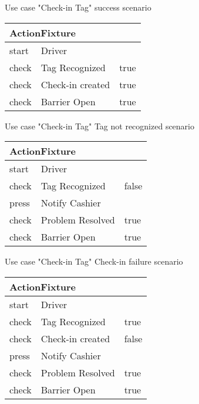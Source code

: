 
\noindent Use case "Check-in Tag" success scenario
\madeby{\mt}{\jb}

\vspace{0.4cm}
\begin{tabular}{| p{2cm} | p{5.5cm} | p{5.5cm} |} \hline
\multicolumn{3}{|l|}{ActionFixture} \\ \hline
start & \multicolumn{2}{|l|}{Driver} \\ \hline
check & Tag Recognized & true \\ \hline
check & Check-in created & true \\ \hline
check & Barrier Open & true \\ \hline
\end{tabular}
\vspace{0.8cm}

\noindent Use case "Check-in Tag" Tag not recognized scenario
\madeby{\mt}{\jb}

\vspace{0.4cm}
\begin{tabular}{| p{2cm} | p{5.5cm} | p{5.5cm} |} \hline
\multicolumn{3}{|l|}{ActionFixture} \\ \hline
start & \multicolumn{2}{|l|}{Driver} \\ \hline
check & Tag Recognized & false \\ \hline
press & \multicolumn{2}{|l|}{Notify Cashier} \\ \hline
check & Problem Resolved & true \\ \hline
check & Barrier Open & true \\ \hline
\end{tabular}
\vspace{0.8cm}

\noindent Use case "Check-in Tag" Check-in failure scenario
\madeby{\mt}{\jb}

\vspace{0.4cm}
\begin{tabular}{| p{2cm} | p{5.5cm} | p{5.5cm} |} \hline
\multicolumn{3}{|l|}{ActionFixture} \\ \hline
start & \multicolumn{2}{|l|}{Driver} \\ \hline
check & Tag Recognized & true \\ \hline
check & Check-in created & false \\ \hline
press & \multicolumn{2}{|l|}{Notify Cashier} \\ \hline
check & Problem Resolved & true \\ \hline
check & Barrier Open & true \\ \hline
\end{tabular}
\vspace{0.8cm}



